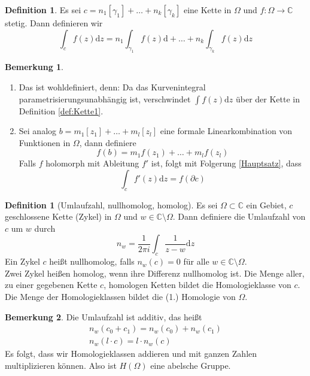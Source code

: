 \documentclass[11pt,titlepage]{article}
\theoremstyle{definition}
\newtheorem{definition}[theorem]{Definition}
\newtheorem{remark}{Bemerkung}
\theoremstyle{remark}
\begin{document}
	\begin{definition}
		Es sei $c=n_1[\gamma_1]+\ldots+n_k[\gamma_k]$ eine Kette in $\Omega$ und 
		$f:\Omega\to\mathbb{C}$ stetig. Dann definieren wir
		\[ \int_c f(z)\mathrm{d}z =n_1 \int_{\gamma_1}f(z)\mathrm{d}+\ldots+
		n_k \int_{\gamma_k}f(z)\mathrm{d}z \]
	\end{definition}
	
	\begin{remark}
		\begin{enumerate}
			\item Das ist wohldefiniert, denn: Da das Kurvenintegral parametrisierungsunabhängig ist, 
			verschwindet $\int f(z)\mathrm{d}z$ über der Kette in Definition \ref{def:Kette1}.
			
			\item Sei analog $b=m_1[z_1]+\ldots+m_l[z_l]$ eine formale Linearkombination von 
			Funktionen in $\Omega$, dann definiere
			\[ f(b)=m_1f(z_1)+\ldots+m_lf(z_l) \]
			Falls $f$ holomorph mit Ableitung $f'$ ist, folgt mit Folgerung \ref{Hauptsatz}, dass
			\[ \int_c f'(z)\mathrm{d}z=f(\partial c) \]
		\end{enumerate}
	\end{remark}
	
	\begin{definition}[Umlaufzahl, nullhomolog, homolog]
		Es sei $\Omega\subset\mathbb{C}$ ein Gebiet, $c$ geschlossene Kette (Zykel) in $\Omega$ 
		und $w\in\mathbb{C}\setminus\Omega$. Dann definiere die Umlaufzahl von $c$ um $w$ durch
		\[ n_w = \frac{1}{2\pi i} \int_c \frac{1}{z-w}\mathrm{d}z \]
		Ein Zykel $c$ heißt nullhomolog, falls $n_w(c)=0$ für alle $w\in\mathbb{C}\setminus\Omega$. \\
		Zwei Zykel heißen homolog, wenn ihre Differenz nullhomolog ist. Die Menge aller, zu einer 
		gegebenen Kette $c$, homologen Ketten bildet die Homologieklasse von $c$. 
		Die Menge der Homologieklassen bildet die (1.) Homologie von $\Omega$.
	\end{definition}
	
		\begin{remark}
		Die Umlaufzahl ist additiv, das heißt
		\begin{eqnarray*}
			n_w(c_0+c_1)=n_w(c_0)+n_w(c_1) \\
			n_w(l\cdot c)=l\cdot n_w(c)
		\end{eqnarray*}
		Es folgt, dass wir Homologieklassen addieren und mit ganzen Zahlen multiplizieren können. 
		Also ist $H(\Omega)$ eine abelsche Gruppe.
	\end{remark}
	
\end{document}
